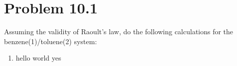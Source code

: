 \documentclass{article}
\begin{document}
\section*{Problem 10.1}
Assuming the validity of Raoult's law, do the following calculations
for the benzene(1)/toluene(2) system:
\begin{enumerate}
  \item hello world yes
\end{enumerate}
\end{document}
